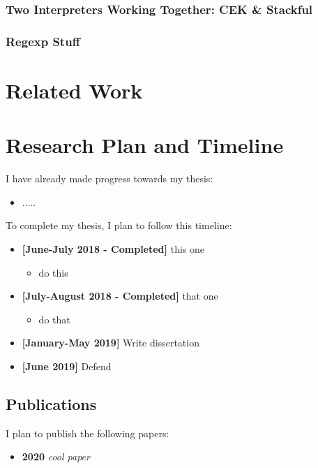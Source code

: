 \documentclass[9pt]{extarticle}
\begin{document}
\subsubsection{Two Interpreters Working Together: CEK \& Stackful}

\subsubsection{Regexp Stuff}

\section{Related Work}



\section{Research Plan and Timeline}

I have already made progress towards my thesis:

\begin{itemize}
  \item .....
\end{itemize}

To complete my thesis, I plan to follow this timeline:

\begin{itemize}
  \item \textbf{[June-July 2018 - Completed]} this one
    \begin{itemize}
    \item do this
    \end{itemize}
  \item \textbf{[July-August 2018 - Completed]} that one
    \begin{itemize}
      \item do that
    \end{itemize}
  \item \textbf{[January-May 2019]} Write dissertation
  \item \textbf{[June 2019]} Defend
\end{itemize}

\subsection{Publications}

I plan to publish the following papers:

\begin{itemize}
  \item \textbf{2020} \emph{cool paper}
\end{itemize}

\printbibliography
\end{document}
